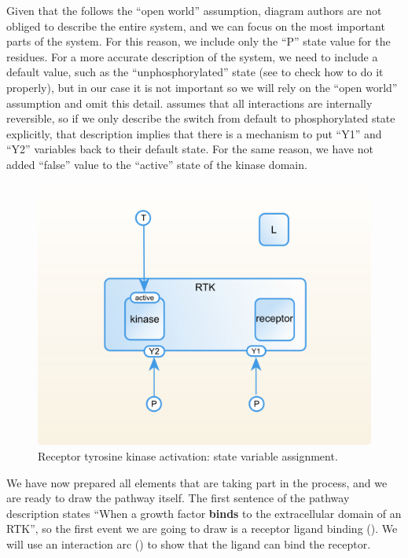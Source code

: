 Given that the \SBGNERLone follows the ``open world'' assumption, diagram authors are not obliged to describe the entire system, and we can focus on the most important parts of the system. For this reason, we include only the ``P'' state value for the residues. For a more accurate description of the system, we need to include a default value, such as the ``unphosphorylated'' state (see  to check how to do it properly), but in our case it is not important so we will rely on the ``open world'' assumption and omit this detail.  \SBGNERLone assumes that all interactions are internally reversible, so if we only describe the switch from default to phosphorylated state explicitly, that description implies that there is a mechanism to put ``Y1'' and ``Y2'' variables back to their default state. For the same reason,  we have not added ``false'' value to the ``active'' state of the kinase domain.
 
\begin{figure}[H]
  \centering
  \vspace*{-0.75em}
  \includegraphics[scale=0.75]{examples/rtk-states.png}
   \caption{Receptor tyrosine kinase activation: state variable assignment.}
  \label{fig:rtk-states}
\end{figure}

We have now prepared all elements that are taking part in the process, and we are ready to draw the pathway itself. The first sentence of the pathway description states ``When a growth factor \textbf{binds} to the extracellular domain of an RTK'', so the first event we are going to draw is a receptor ligand binding (). We will use an interaction arc () to show that the ligand can bind the receptor.

